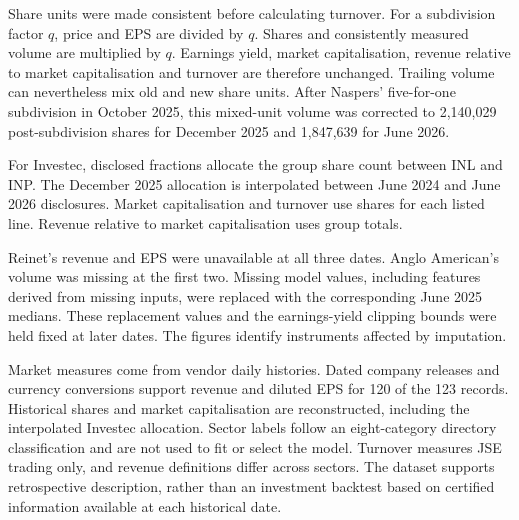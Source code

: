 Share units were made consistent before calculating turnover. For a subdivision factor $q$, price and EPS are divided by $q$. Shares and consistently measured volume are multiplied by $q$. Earnings yield, market capitalisation, revenue relative to market capitalisation and turnover are therefore unchanged. Trailing volume can nevertheless mix old and new share units. After Naspers' five-for-one subdivision in October 2025, this mixed-unit volume was corrected to 2,140,029 post-subdivision shares for December 2025 and 1,847,639 for June 2026.

For Investec, disclosed fractions allocate the group share count between INL and INP. The December 2025 allocation is interpolated between June 2024 and June 2026 disclosures. Market capitalisation and turnover use shares for each listed line. Revenue relative to market capitalisation uses group totals.

Reinet's revenue and EPS were unavailable at all three dates. Anglo American's volume was missing at the first two. Missing model values, including features derived from missing inputs, were replaced with the corresponding June 2025 medians. These replacement values and the earnings-yield clipping bounds were held fixed at later dates. The figures identify instruments affected by imputation.

Market measures come from vendor daily histories. Dated company releases and currency conversions support revenue and diluted EPS for 120 of the 123 records. Historical shares and market capitalisation are reconstructed, including the interpolated Investec allocation. Sector labels follow an eight-category directory classification and are not used to fit or select the model. Turnover measures JSE trading only, and revenue definitions differ across sectors. The dataset supports retrospective description, rather than an investment backtest based on certified information available at each historical date.
